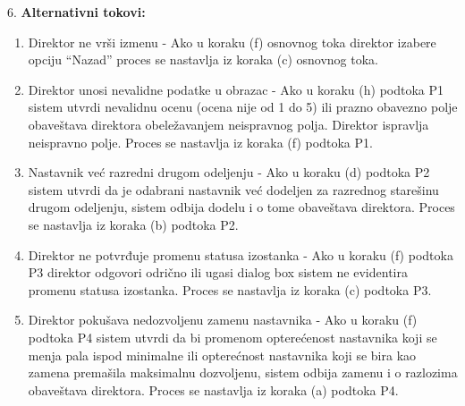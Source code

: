 \documentclass{article}
\begin{document}
6. \textbf{Alternativni tokovi:}
\begin{enumerate} [label=(\roman*)]
    \item Direktor ne vrši izmenu - Ako u koraku (f) osnovnog toka direktor izabere opciju ``Nazad'' proces se nastavlja iz koraka (c) osnovnog toka.
    \item Direktor unosi nevalidne podatke u obrazac - Ako u koraku (h) podtoka P1 sistem utvrdi nevalidnu ocenu (ocena nije od 1 do 5) ili prazno obavezno polje obaveštava direktora obeležavanjem neispravnog polja. Direktor ispravlja neispravno polje. Proces se nastavlja iz koraka (f) podtoka P1.
    \item Nastavnik već razredni drugom odeljenju - Ako u koraku (d) podtoka P2 sistem utvrdi da je odabrani nastavnik već dodeljen za razrednog starešinu drugom odeljenju, sistem odbija dodelu i o tome obaveštava direktora. Proces se nastavlja iz koraka (b) podtoka P2.
    \item Direktor ne potvrđuje promenu statusa izostanka - Ako u koraku (f) podtoka P3 direktor odgovori odrično ili ugasi dialog box sistem ne evidentira promenu statusa izostanka. Proces se nastavlja iz koraka (c) podtoka P3.
    \item Direktor pokušava nedozvoljenu zamenu nastavnika - Ako u koraku (f) podtoka P4 sistem utvrdi da bi promenom opterećenost nastavnika koji se menja pala ispod minimalne ili opterećnost nastavnika koji se bira kao zamena premašila maksimalnu dozvoljenu, sistem odbija zamenu i o razlozima obaveštava direktora. Proces se nastavlja iz koraka (a) podtoka P4.
\end{enumerate}
\end{document}
